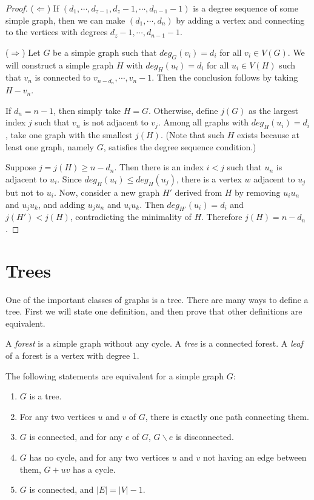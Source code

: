         \begin{proof}
            ($\Leftarrow$) If $(d_1,\cdots,d_{z-1},d_z-1,\cdots,d_{n-1}-1)$ is a degree sequence of some simple graph, then we can make $(d_1,\cdots,d_n)$ by adding a vertex and connecting to the vertices with degrees $d_z-1,\cdots,d_{n-1}-1$.
            
            ($\Rightarrow$) Let $G$ be a simple graph such that $deg_G(v_i)=d_i$ for all $v_i \in V(G)$. We will construct a simple graph $H$ with $deg_H(u_i)=d_i$ for all $u_i \in V(H)$ such that $v_n$ is connected to $v_{n-d_n},\cdots,v_n-1$. Then the conclusion follows by taking $H-v_n$.
            
            If $d_n=n-1$, then simply take $H=G$. Otherwise, define $j(G)$ as the largest index $j$ such that $v_n$ is not adjacent to $v_j$. Among all graphs with $deg_H(u_i)=d_i$, take one graph with the smallest $j(H)$. (Note that such $H$ exists because at least one graph, namely $G$, satisfies the degree sequence condition.)
            
            Suppose $j=j(H) \geq n-d_n$. Then there is an index $i<j$ such that $u_n$ is adjacent to $u_i$. Since $deg_H(u_i) \leq deg_H(u_j)$, there is a vertex $w$ adjacent to $u_j$ but not to $u_i$. Now, consider a new graph $H'$ derived from $H$ by removing $u_iu_n$ and $u_ju_k$, and adding $u_ju_n$ and $u_iu_k$. Then $deg_{H'}(u_i)=d_i$ and $j(H')<j(H)$, contradicting the minimality of $H$. Therefore $j(H) = n-d_n$.
        \end{proof}
    
    \section{Trees}
        One of the important classes of graphs is a tree. There are many ways to define a tree. First we will state one definition, and then prove that other definitions are equivalent.
        \begin{defn}[Tree] \label{def_tree}
            A \emph{forest} is a simple graph without any cycle. A \emph{tree} is a connected forest. A \emph{leaf} of a forest is a vertex with degree 1.
        \end{defn}
        
        \begin{thm} \label{thm_tree}
            The following statements are equivalent for a simple graph $G$: \begin{enumerate}
                \item $G$ is a tree.
                \item For any two vertices $u$ and $v$ of $G$, there is exactly one path connecting them.
                \item $G$ is connected, and for any $e$ of $G$, $G \backslash e$ is disconnected.
                \item $G$ has no cycle, and for any two vertices $u$ and $v$ not having an edge between them, $G+uv$ has a cycle.
                \item $G$ is connected, and $|E| = |V|-1$.
            \end{enumerate}
        \end{thm}

